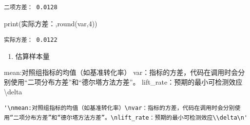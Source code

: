 \documentclass[
  letterpaper,
  DIV=11,
  numbers=noendperiod]{scrreprt}
\newenvironment{Shaded}{\begin{snugshade}}{\end{snugshade}}
\newcommand{\BuiltInTok}[1]{\textcolor[rgb]{0.00,0.23,0.31}{#1}}
\newcommand{\CommentTok}[1]{\textcolor[rgb]{0.37,0.37,0.37}{#1}}
\newcommand{\DecValTok}[1]{\textcolor[rgb]{0.68,0.00,0.00}{#1}}
\newcommand{\ErrorTok}[1]{\textcolor[rgb]{0.68,0.00,0.00}{#1}}
\newcommand{\NormalTok}[1]{\textcolor[rgb]{0.00,0.23,0.31}{#1}}
\newcommand{\StringTok}[1]{\textcolor[rgb]{0.13,0.47,0.30}{#1}}
\providecommand{\tightlist}{%
  \setlength{\itemsep}{0pt}\setlength{\parskip}{0pt}}
\begin{document}
\begin{verbatim}
二项方差： 0.0128
\end{verbatim}

\begin{Shaded}
\begin{Highlighting}[]
\BuiltInTok{print}\NormalTok{(}\StringTok{\textquotesingle{}实际方差：\textquotesingle{}}\NormalTok{,}\BuiltInTok{round}\NormalTok{(var,}\DecValTok{4}\NormalTok{))}
\end{Highlighting}
\end{Shaded}

\begin{verbatim}
实际方差： 0.0122
\end{verbatim}

\begin{enumerate}
\def\labelenumi{\arabic{enumi}.}
\setcounter{enumi}{2}
\tightlist
\item
  估算样本量
\end{enumerate}

\begin{Shaded}
\begin{Highlighting}[]
\CommentTok{\textquotesingle{}\textquotesingle{}\textquotesingle{}}
\CommentTok{mean:对照组指标的均值（如基准转化率）}
\CommentTok{var：指标的方差，代码在调用时会分别使用“二项分布方差”和“德尔塔方法方差”。}
\CommentTok{lift\_rate：预期的最小可检测效应}\ErrorTok{\textbackslash{}}\CommentTok{delta}
\CommentTok{\textquotesingle{}\textquotesingle{}\textquotesingle{}}
\end{Highlighting}
\end{Shaded}

\begin{verbatim}
'\nmean:对照组指标的均值（如基准转化率）\nvar：指标的方差，代码在调用时会分别使用“二项分布方差”和“德尔塔方法方差”。\nlift_rate：预期的最小可检测效应\\delta\n'
\end{verbatim}
\end{document}
